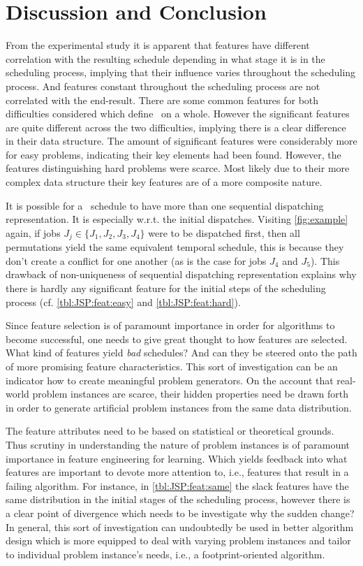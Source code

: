 \section{Discussion and Conclusion}
From the experimental study it is apparent that features have different %
correlation with the resulting schedule depending in what stage it is in the scheduling process, implying that their influence varies throughout the scheduling process. And features constant throughout the scheduling process are not correlated with the end-result.
There are some common features for both difficulties considered which define \JSP\ on a whole. However the significant features are quite different across the two difficulties, implying there is a clear difference in their data structure. The amount of significant features were considerably more for easy problems, indicating their key elements had been found. However, the features distinguishing hard problems were scarce. Most likely due to their more complex data structure their key features are of a more composite nature.

It is possible for a \JSP\ schedule to have more than one sequential dispatching representation. It is especially w.r.t. the initial dispatches. Visiting \cref{fig:example} again, if jobs $J_j\in\{J_1,J_2,J_3,J_4\}$ were to be dispatched first, then all permutations yield the same equivalent temporal schedule, this is because they don't create a conflict for one another (as is the case for jobs $J_4$ and $J_5$). This drawback of non-uniqueness of sequential dispatching representation explains why there is hardly any significant feature for the initial steps of the scheduling process (cf. \cref{tbl:JSP:feat:easy} and \cref{tbl:JSP:feat:hard}). 

Since feature selection is of paramount importance in order for algorithms to become successful, one needs to give great thought to how features are selected. What kind of features yield \emph{bad} schedules? And can they be steered onto the path of more promising feature characteristics. This sort of investigation can be an indicator how to create meaningful problem generators. On the account that real-world problem instances are scarce, their hidden properties need be drawn forth in order to generate artificial problem instances from the same data distribution. 

The feature attributes need to be based on statistical or theoretical grounds. Thus scrutiny in understanding the nature of problem instances is of paramount importance in feature engineering for learning. Which yields feedback into what features are important to devote more attention to, i.e., features that result in a failing algorithm. For instance, in \cref{tbl:JSP:feat:same} the slack features have the same distribution in the initial stages of the scheduling process, however there is a clear point of divergence which needs to be investigate why the sudden change? 
In general, this sort of investigation can undoubtedly be used in better algorithm design which is more equipped to deal with varying problem instances and tailor to individual problem instance's needs, i.e., a footprint-oriented algorithm. 

